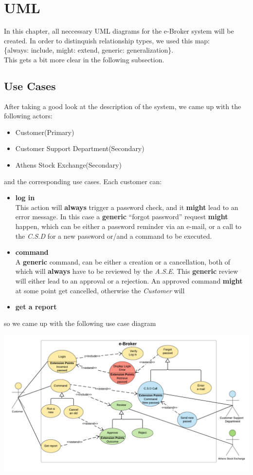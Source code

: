 \documentclass{article}
\begin{document}
\newpage
\section{UML}
In this chapter, all neccessary UML diagrams for the e-Broker system will be created. In order to distinquish relationship types, we used this map: \\\hspace*{16mm}\{always: include, might: extend, generic: generalization\}. \\
This gets a bit more clear in the following subsection. 
\subsection{Use Cases}
After taking a good look at the description of the system, we came up with the following actors:
\begin{itemize}
\item Customer(Primary)
\item Customer Support Department(Secondary)
\item Athens Stock Exchange(Secondary)
\end{itemize}
 and the corresponding use cases. Each customer can:
\begin{itemize}
\item \textbf{log in}\\This action will \textbf{always} trigger a password check, and it 
\textbf{might} lead to an error message. In this case a \textbf{generic} ``forgot password'' request \textbf{might} happen, which can be either a password reminder via an e-mail, or a call to the \textit{C.S.D} for a new password or/and a command to be executed.
\item \textbf{command}\\A \textbf{generic} command, can be either a creation or a cancellation, both of which will \textbf{always} have to be reviewed by the \textit{A.S.E}. This \textbf{generic} review will either lead to an approval or a rejection. An approved command \textbf{might} at some point get cancelled, otherwise the \textit{Customer} will 
\item \textbf{get a report}
\end{itemize}
so we came up with the following use case diagram\\
\begin{center}
	\includegraphics[scale=0.3]{use_cases}
\end{center}
\end{document}
